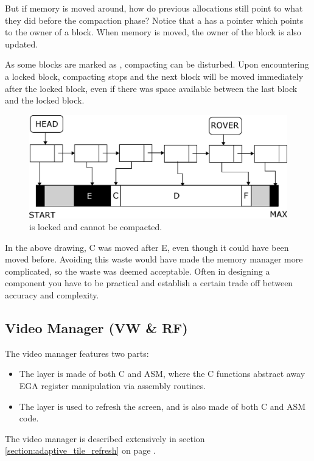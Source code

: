 \documentclass[book.tex]{subfiles}
\begin{document}
 \par
But if memory is moved around, how do previous allocations still point to what they did before the compaction phase? Notice that a  has a  pointer which points to the owner of a block.  When memory is moved, the owner of the block is also updated.\\
\par
As some blocks are marked as , compacting can be disturbed. Upon encountering a locked block, compacting stops and the next block will be moved immediately after the locked block, even if there was space available between the last block and the locked block.\\
   \par
\begin{figure}[H]
\centering
 \includegraphics[width=\textwidth]{imgs/drawings/mm_bad_compact.eps}
 \caption{ is locked and cannot be compacted.}
 \end{figure}
 \par
  In the above drawing, C was moved after E, even though it could have been moved before. Avoiding this waste would have made the memory manager more complicated, so the waste was deemed acceptable. Often in designing a component you have to be practical and establish a certain trade off between accuracy and complexity.\\
  \par
  
  
  


\subsection{Video Manager (VW \& RF)}
The video manager features two parts:
\begin{itemize}
\item The  layer is made of both C and ASM, where the C functions abstract away EGA register manipulation via assembly routines. 
\item The  layer is used to refresh the screen, and is also made of both C and ASM code.
\end{itemize}
The video manager is described extensively in section \ref{section:adaptive_tile_refresh} on page \pageref{section:adaptive_tile_refresh}.
\par
\end{document}
